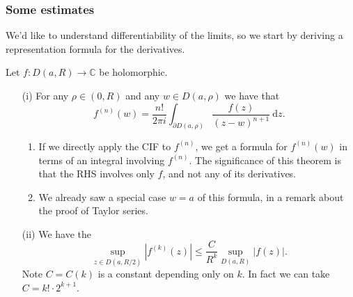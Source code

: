 \documentclass[egregdoesnotlikesansseriftitles,a4paper]{scrartcl}
\begin{document}
\subsubsection*{Some estimates}
We'd like to understand differentiability of the limits, so we start by deriving a representation formula for the derivatives.
\begin{theorem}
     Let $f: D (a,R) \rightarrow \mathbb{C}$ be holomorphic. 
      \begin{itemize}
           \item[(i)] For any $\rho \in (0,R)$ and any $w \in D (a,\rho)$ we have that \[
               f^{(n)}(w)= \frac{n!}{2\pi i}\int_{\partial D (a,\rho)}^{} \frac{f (z)}{(z-w)^{n+1}}\ \mathrm{d} z
               .\] 
          \begin{remarks}
               \begin{enumerate}
                    \item If we directly apply the CIF to $f^{(n)}$, we get a formula for $f^{(n)}(w)$ in terms of an integral involving $f^{(n)}$. The significance of this theorem is that the RHS involves only $f$, and not any of its derivatives.
                    \item We already saw a special case $w=a$ of this formula, in a remark about the proof of Taylor series.
               \end{enumerate}
          \end{remarks}
           \item[(ii)] We have the  \[
           \sup_{z \in D (a,R/2)} \left|f^{(k)}(z)\right|\leq \frac{C}{R^{k}}\sup_{D (a,R)}\left|f (z)\right|
           .\] Note $C=C (k)$ is a constant depending only on $k$. In fact we can take $C=k! \cdot  2^{k+1}$.
      \end{itemize}
\end{theorem}
\end{document}
